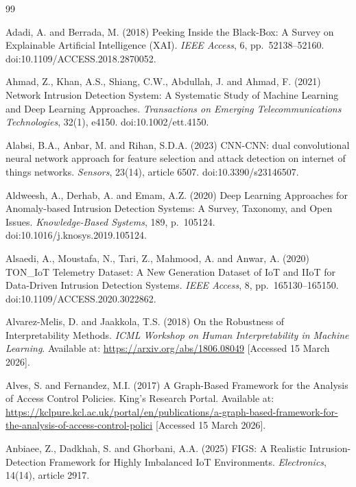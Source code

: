 \documentclass[12pt,a4paper]{report}
\begin{document}
\begin{thebibliography}{99}

Adadi, A. and Berrada, M. (2018) Peeking Inside the Black-Box: A Survey on Explainable Artificial Intelligence (XAI). \textit{IEEE Access}, 6, pp.~52138--52160. doi:10.1109/ACCESS.2018.2870052.

Ahmad, Z., Khan, A.S., Shiang, C.W., Abdullah, J. and Ahmad, F. (2021) Network Intrusion Detection System: A Systematic Study of Machine Learning and Deep Learning Approaches. \textit{Transactions on Emerging Telecommunications Technologies}, 32(1), e4150. doi:10.1002/ett.4150.

Alabsi, B.A., Anbar, M. and Rihan, S.D.A. (2023) CNN-CNN: dual convolutional neural network approach for feature selection and attack detection on internet of things networks. \textit{Sensors}, 23(14), article 6507. doi:10.3390/s23146507.

Aldweesh, A., Derhab, A. and Emam, A.Z. (2020) Deep Learning Approaches for Anomaly-based Intrusion Detection Systems: A Survey, Taxonomy, and Open Issues. \textit{Knowledge-Based Systems}, 189, p.~105124. doi:10.1016/j.knosys.2019.105124.

Alsaedi, A., Moustafa, N., Tari, Z., Mahmood, A. and Anwar, A. (2020) TON\_IoT Telemetry Dataset: A New Generation Dataset of IoT and IIoT for Data-Driven Intrusion Detection Systems. \textit{IEEE Access}, 8, pp.~165130--165150. doi:10.1109/ACCESS.2020.3022862.

Alvarez-Melis, D. and Jaakkola, T.S. (2018) On the Robustness of Interpretability Methods. \textit{ICML Workshop on Human Interpretability in Machine Learning}. Available at: \url{https://arxiv.org/abs/1806.08049} [Accessed 15 March 2026].

Alves, S. and Fernandez, M.I. (2017) A Graph-Based Framework for the Analysis of Access Control Policies. King's Research Portal. Available at: \url{https://kclpure.kcl.ac.uk/portal/en/publications/a-graph-based-framework-for-the-analysis-of-access-control-polici} [Accessed 15 March 2026].

Anbiaee, Z., Dadkhah, S. and Ghorbani, A.A. (2025) FIGS: A Realistic Intrusion-Detection Framework for Highly Imbalanced IoT Environments. \textit{Electronics}, 14(14), article 2917.


\end{thebibliography}
\end{document}
